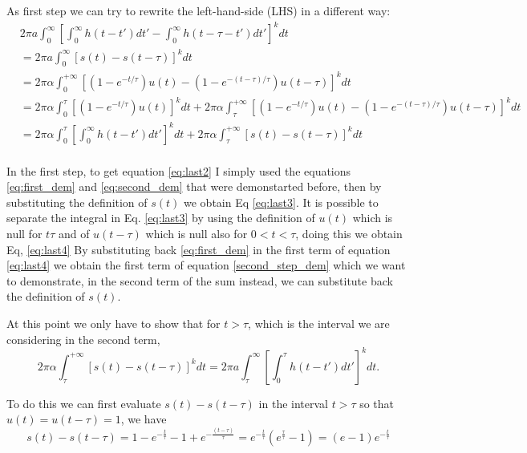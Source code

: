 As first step we can try to rewrite the left-hand-side (LHS) in a different way:
\begin{align}
    & 2\pi a \int_{0}^{\infty} \left[ \int_{0}^{\infty} h(t - t') dt' - \int_{0}^{\infty} h(t - \tau - t') dt' \right]^k dt\\ \label{eq:last1}
    &= 2\pi a \int_{0}^{\infty} \left[s(t) -s(t-\tau)\right]^k dt\\ \label{eq:last2}
    &= 2\pi\alpha \int_0^{+\infty} \left[\left(1 - e^{-t/\tau}\right) u(t) - \left(1 - e^{-(t - \tau)/\tau}\right) u(t - \tau)\right]^k dt\\ \label{eq:last3}
    &= 2\pi\alpha \int_0^{\tau} \left[ \left(1 - e^{-t/\tau}\right)u(t)\right]^k dt + 2\pi\alpha \int_{\tau}^{+\infty} \left[ \left(1 - e^{-t/\tau}\right)u(t) - \left(1 - e^{-(t - \tau)/\tau}\right)u(t-\tau) \right]^k dt\\ \label{eq:last4}
    &=  2\pi\alpha \int_0^{\tau} \left[\int_{0}^{\infty} h(t - t') dt' \right]^k dt + 2\pi\alpha \int_{\tau}^{+\infty} \left[ s(t) - s(t-\tau) \right]^k dt\\ \label{eq:last_step}
\end{align}

In the first step, to get equation \ref{eq:last2} I simply used the equations \ref{eq:first_dem} and \ref{eq:second_dem} that were demonstarted before, then by substituting the definition of $s(t)$ we obtain Eq \ref{eq:last3}.
It is possible to separate the integral in Eq. \ref{eq:last3} by using the definition of $u(t)$ which is null for $t\tau$ and of $u(t-\tau)$ which is null also for $0<t<\tau$, doing this we obtain Eq, \ref{eq:last4}
By substituting back \ref{eq:first_dem} in the first term of equation \ref{eq:last4} we obtain the first term of equation \ref{second_step_dem} which we want to demonstrate, in the second term of the sum instead, we can substitute back the definition of $s(t)$.

At this point we only have to show that for $t>\tau$, which is the interval we are considering in the second term, 
\begin{equation}
    2\pi\alpha \int_{\tau}^{+\infty} \left[ s(t) - s(t-\tau) \right]^k dt = 2\pi a \int_{\tau}^{\infty} \left[ \int_{0}^{\tau} h(t - t') dt' \right]^k dt.
\end{equation}

To do this we can first evaluate $s(t)-s(t-\tau)$ in the interval $t>\tau$ so that $u(t)=u(t-\tau)=1$, we have
\begin{equation}\label{eq:final}
    s(t) - s(t-\tau) = 1- e^{-\frac{t}{\tau}} - 1 + e^{-\frac{(t-\tau)}{\tau}} = e^{-\frac{t}{\tau}} \left(e^{\frac{\tau}{\tau}}-1\right) = (e-1)e^{-\frac{t}{\tau}}
\end{equation}

